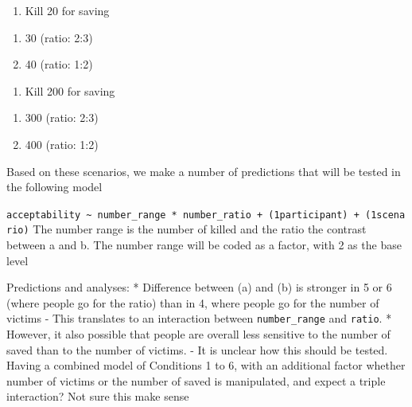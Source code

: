 \documentclass[
]{article}
\providecommand{\tightlist}{%
  \setlength{\itemsep}{0pt}\setlength{\parskip}{0pt}}
\begin{document}
\begin{enumerate}
\def\labelenumi{\arabic{enumi}.}
\setcounter{enumi}{4}
\tightlist
\item
  Kill 20 for saving
\end{enumerate}

\begin{enumerate}
\def\labelenumi{\alph{enumi}.}
\tightlist
\item
  30 (ratio: 2:3)
\item
  40 (ratio: 1:2)
\end{enumerate}

\begin{enumerate}
\def\labelenumi{\arabic{enumi}.}
\setcounter{enumi}{5}
\tightlist
\item
  Kill 200 for saving
\end{enumerate}

\begin{enumerate}
\def\labelenumi{\alph{enumi}.}
\tightlist
\item
  300 (ratio: 2:3)
\item
  400 (ratio: 1:2)
\end{enumerate}

Based on these scenarios, we make a number of predictions that will be tested in the following model

\textbar{} \texttt{acceptability\ \textasciitilde{}\ number\_range\ *\ number\_ratio\ +\ (1\textbar{}participant)\ +\ (1\textbar{}scenario)} \textbar{} \textbar{} The number range is the number of killed and the ratio the contrast between a and b. \textbar{} \textbar{} The number range will be coded as a factor, with 2 as the base level \textbar{}

Predictions and analyses: * Difference between (a) and (b) is stronger in 5 or 6 (where people go for the ratio) than in 4, where people go for the number of victims - This translates to an interaction between \texttt{number\_range} and \texttt{ratio}. * However, it also possible that people are overall less sensitive to the number of saved than to the number of victims. - It is unclear how this should be tested. Having a combined model of Conditions 1 to 6, with an additional factor whether number of victims or the number of saved is manipulated, and expect a triple interaction? Not sure this make sense
\end{document}

